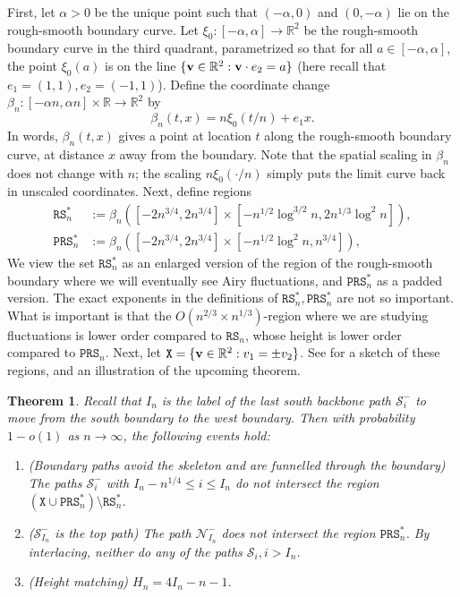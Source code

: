 \documentclass[11pt,twoside]{amsart}
\theoremstyle{plain}
\newtheorem{thm}{Theorem}[section]
\numberwithin{quest}{section}
\theoremstyle{remark}
\numberwithin{rem}{section}
\theoremstyle{definition}
\newcommand{\R}{\mathbb{R}}
\newcommand{\cS}{\mathcal{S}}
\newcommand{\cN}{\mathcal{N}}
\renewcommand{\tt}[1]{{\mathtt{#1}}}
\begin{document}
	First, let $\alpha > 0$ be the unique point such that $(-\alpha, 0)$ and $(0, -\alpha)$ lie on the rough-smooth boundary curve. Let $\xi_0:[-\alpha, \alpha] \to \R^2$ be the rough-smooth boundary curve in the third quadrant, parametrized so that for all $a \in [-\alpha, \alpha]$, the point $\xi_0(a)$ is on the line $\{ {\bf v} \in \R^2 : \mathbf{v} \cdot e_2 = a \}$ (here recall that $e_1 = (1, 1), e_2 = (-1, 1)$). Define the coordinate change $\beta_n:[-\alpha n,  \alpha n] \times \R \to \R^2$ by
	$$
	\beta_n(t, x) = n\xi_0(t/n) + e_1 x.
	$$
	In words, $\beta_n(t, x)$ gives a point at location $t$ along the rough-smooth boundary curve, at distance $x$ away from the boundary. Note that the spatial scaling in $\beta_n$ does not change with $n$; the scaling $n \xi_0(\cdot/n)$ simply puts the limit curve back in unscaled coordinates. Next, define regions
		\begin{align*}
		\tt{RS}_n^* &:= \beta_n([-2n^{3/4}, 2n^{3/4}] \times [- n^{1/2} \log^{3/2} n, 2n^{1/3} \log^2 n]), \\
		\tt{PRS}_n^* &:= \beta_n([-2n^{3/4}, 2n^{3/4}] \times [- n^{1/2} \log^{2} n, n^{3/4}]),
	\end{align*}
	We view the set $\tt{RS}_n^*$ as an enlarged version of the region of the rough-smooth boundary where we will eventually see Airy fluctuations,
	and $\tt{PRS}_n^*$ as a padded version. The exact exponents in the definitions of $\tt{RS}_n^*, \tt{PRS}_n^*$ are not so important. What is important is that the $O(n^{2/3} \times n^{1/3})$-region where we are studying fluctuations is lower order compared to $\tt{RS}_n$, whose height is lower order compared to $\tt{PRS}_n$. Next, let $\tt{X} = \{{\bf v} \in \R^2 : v_1 = \pm v_2\}$.  See  for a sketch of these regions, and an illustration of the upcoming theorem.
	\begin{thm}
		\label{T:main-3}
		Recall that $I_n$ is the label of the last south backbone path $\cS_i^-$ to move from the south boundary to the west boundary. Then with probability $1 - o(1)$ as $n \to \infty$, the following events hold:
		\begin{enumerate}[label=\arabic*.]
			\item (Boundary paths avoid the skeleton and are funnelled through the boundary) The paths $\cS_i^-$ with $I_n - n^{1/4} \le i \le I_n$ do not intersect the region $(\tt{X} \cup \tt{PRS}_n^*)\setminus \tt{RS}_n^*$.
			\item ($\cS_{I_n}^-$ is the top path) The path $\cN_{I_n}^-$ does not intersect the region $\tt{PRS}_n^*$. By interlacing, neither do any of the paths $\cS_i, i > I_n$.
			\item (Height matching) $H_n = 4I_n - n - 1$. 
		\end{enumerate}		
	\end{thm}
\end{document}
